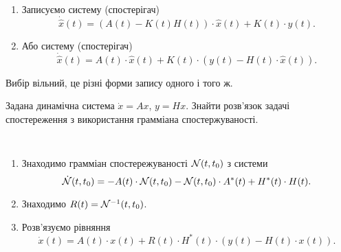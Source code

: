 \begin{algorithm} \tt
    \begin{enumerate}
        \item Записуємо систему (спостерігач) \[ \dot{\hat{x}} (t) = (A (t) - K (t) H (t)) \cdot \hat x (t) + K(t) \cdot y(t).\]
        \item Або систему (спостерігач) \[ \dot{\hat{x}} (t) = A (t) \cdot \hat x (t) + K(t) \cdot (y(t) - H(t) \cdot \hat x(t)).\]
    \end{enumerate}
    Вибір вільний, це різні форми запису одного і того ж.
\end{algorithm}

\begin{problem*}
    Задана динамічна система $\dot x = A x$, $y = H x$. Знайти розв'язок задачі спостереження з використання грамміана спостержуваності.
\end{problem*}

\begin{algorithm} \tt
    \begin{enumerate}
        \item Знаходимо грамміан спостережуваності $\mathcal{N}(t,t_0)$ з сис\-те\-ми \[ \dot {\mathcal{N}}(t, t_0) = -A(t) \cdot \mathcal{N}(t, t_0) - \mathcal{N}(t, t_0) \cdot A^*(t) + H^*(t) \cdot H(t). \]

        \item Знаходимо $R(t) = \mathcal{N}^{-1}(t, t_0)$.

        \item Розв'язуємо рівняння \[ \dot x(t) = A(t) \cdot x(t) + R(t) \cdot H^*(t) \cdot (y(t) - H(t) \cdot x(t)). \]
    \end{enumerate}
\end{algorithm}

